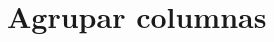 \begin{frame}[fragile]
  \frametitle{}

  \vspace{\baselineskip}
  \begin{lstlisting}

  \end{lstlisting}
\end{frame}

\section{Agrupar columnas}

\begin{frame}[c]{}
\end{frame}

\begin{frame}[fragile]
  \frametitle{}

  \vspace{\baselineskip}
  \begin{lstlisting}

  \end{lstlisting}
\end{frame}

